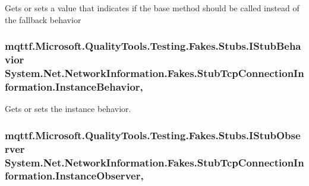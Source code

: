 Gets or sets a value that indicates if the base method should be called instead of the fallback behavior

\hypertarget{class_system_1_1_net_1_1_network_information_1_1_fakes_1_1_stub_tcp_connection_information_a13182c1709c5d17c96db2c840320994b}{
\subsubsection[{Instance\-Behavior}]{\setlength{\rightskip}{0pt plus 5cm}mqttf.\-Microsoft.\-Quality\-Tools.\-Testing.\-Fakes.\-Stubs.\-I\-Stub\-Behavior System.\-Net.\-Network\-Information.\-Fakes.\-Stub\-Tcp\-Connection\-Information.\-Instance\-Behavior\hspace{0.3cm}{\ttfamily [get]}, {\ttfamily [set]}}}\label{class_system_1_1_net_1_1_network_information_1_1_fakes_1_1_stub_tcp_connection_information_a13182c1709c5d17c96db2c840320994b}


Gets or sets the instance behavior.

\hypertarget{class_system_1_1_net_1_1_network_information_1_1_fakes_1_1_stub_tcp_connection_information_afc7fc612718e743168b632403240de6b}{
\subsubsection[{Instance\-Observer}]{\setlength{\rightskip}{0pt plus 5cm}mqttf.\-Microsoft.\-Quality\-Tools.\-Testing.\-Fakes.\-Stubs.\-I\-Stub\-Observer System.\-Net.\-Network\-Information.\-Fakes.\-Stub\-Tcp\-Connection\-Information.\-Instance\-Observer\hspace{0.3cm}{\ttfamily [get]}, {\ttfamily [set]}}}\label{class_system_1_1_net_1_1_network_information_1_1_fakes_1_1_stub_tcp_connection_information_afc7fc612718e743168b632403240de6b}


